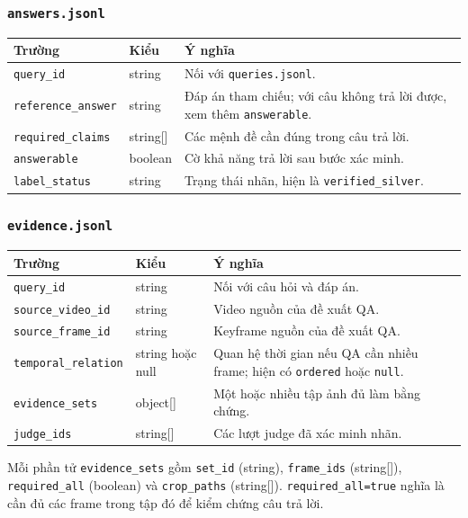 \documentclass[12pt,a4paper,onecolumn]{article}
\begin{document}
\subsubsection{\texttt{answers.jsonl}}

\noindent
\begin{tabularx}{\textwidth}{l l Y}
\toprule
Trường & Kiểu & Ý nghĩa \\
\midrule
\texttt{query\_id} & string & Nối với \texttt{queries.jsonl}. \\
\texttt{reference\_answer} & string & Đáp án tham chiếu; với câu không trả lời được, xem thêm \texttt{answerable}. \\
\texttt{required\_claims} & string[] & Các mệnh đề cần đúng trong câu trả lời. \\
\texttt{answerable} & boolean & Cờ khả năng trả lời sau bước xác minh. \\
\texttt{label\_status} & string & Trạng thái nhãn, hiện là \texttt{verified\_silver}. \\
\bottomrule
\end{tabularx}


\subsubsection{\texttt{evidence.jsonl}}

\noindent
\begin{tabularx}{\textwidth}{l l Y}
\toprule
Trường & Kiểu & Ý nghĩa \\
\midrule
\texttt{query\_id} & string & Nối với câu hỏi và đáp án. \\
\texttt{source\_video\_id} & string & Video nguồn của đề xuất QA. \\
\texttt{source\_frame\_id} & string & Keyframe nguồn của đề xuất QA. \\
\texttt{temporal\_relation} & string hoặc null & Quan hệ thời gian nếu QA cần nhiều frame; hiện có \texttt{ordered} hoặc \texttt{null}. \\
\texttt{evidence\_sets} & object[] & Một hoặc nhiều tập ảnh đủ làm bằng chứng. \\
\texttt{judge\_ids} & string[] & Các lượt judge đã xác minh nhãn. \\
\bottomrule
\end{tabularx}


Mỗi phần tử \texttt{evidence\_sets} gồm \texttt{set\_id} (string), \texttt{frame\_ids} (string[]), \texttt{required\_all} (boolean) và \texttt{crop\_paths} (string[]). \texttt{required\_all=true} nghĩa là cần đủ các frame trong tập đó để kiểm chứng câu trả lời.
\end{document}
